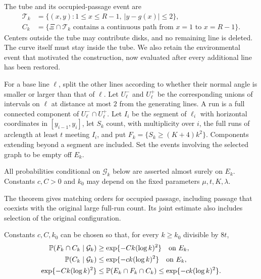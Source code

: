 \documentclass[11pt,letterpaper]{article}
\begin{document}
The tube and its occupied-passage event are
\begin{equation}\label{eq:tube}
\begin{aligned}
 \mathcal T_k&=\{(x,y):1\le x\le R-1,\ |y-g(x)|\le2\},\\
 C_k&=\{\Xi\cap\mathcal T_k\text{ contains a continuous path from }x=1
                                      \text{ to }x=R-1\}.
\end{aligned}
\end{equation}
Centers outside the tube may contribute disks, and no remaining line is deleted. The curve itself must stay inside the tube. We also retain the environmental event that motivated the construction, now evaluated after every additional line has been restored.

For a base line $\ell$, split the other lines according to whether their normal angle is smaller or larger than that of $\ell$. Let $U_\ell^-$ and $U_\ell^+$ be the corresponding unions of intervals on $\ell$ at distance at most $2$ from the generating lines. A run is a full connected component of $U_\ell^-\cap U_\ell^+$. Let $I_i$ be the segment of $\ell_i$ with horizontal coordinates in $[y_{i-1},y_i]$, let $S_k$ count, with multiplicity over $i$, the full runs of arclength at least $t$ meeting $I_i$, and put $F_k=\{S_k\ge(K+4)k^2\}$. Components extending beyond a segment are included. Set the events involving the selected graph to be empty off $E_k$.

All probabilities conditional on $\mathcal G_k$ below are asserted almost surely on $E_k$. Constants $c,C>0$ and $k_0$ may depend on the fixed parameters $\mu,t,K,\lambda$.

The theorem gives matching orders for occupied passage, including passage that coexists with the original large full-run count. Its joint estimate also includes selection of the original configuration.

\begin{theorem}\label{thm:passage}
Constants $c,C,k_0$ can be chosen so that, for every $k\ge k_0$ divisible by $8t$,
\begin{equation}\label{eq:main}
\begin{aligned}
 \P(F_k\cap C_k\mid\mathcal G_k)
 &\ge\exp\{-Ck(\log k)^2\}\quad\text{on }E_k,\\
 \P(C_k\mid\mathcal G_k)
 &\le\exp\{-ck(\log k)^2\}\quad\text{on }E_k,\\
 \exp\{-Ck(\log k)^2\}
 &\le\P(E_k\cap F_k\cap C_k)\le\exp\{-ck(\log k)^2\}.
\end{aligned}
\end{equation}
\end{theorem}
\end{document}

